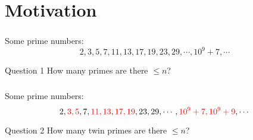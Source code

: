 
\section{Motivation}

\begin{frame}\frametitle{\insertsection}
Some prime numbers:
\[
  2, 3, 5, 7, 11, 13, 17, 19, 23, 29, \cdots, 10^9 + 7, \cdots
\]
\begin{block}{Question 1}
  \pause
  How many primes are there \(\leq n\)?
\end{block}
\end{frame}

\begin{frame}\frametitle{\insertsection}
Some prime numbers:
\[
  2, {\color{red} 3, 5}, 7, {\color{red} 11, 13}, {\color{red} 17, 19}, 23, 29, \cdots, {\color{red} 10^9 + 7, 10^9 + 9}, \cdots
\]
\begin{block}{Question 2}
  \pause
  How many {\color{red} twin} primes are there \(\leq n\)?
\end{block}
\end{frame}
